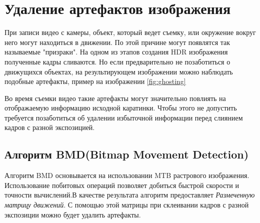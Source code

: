 \section {Удаление артефактов изображения}

При записи видео с камеры, объект, который ведет съемку, или окружение вокруг него могут находиться в движении. По этой причине могут появлятся так называемые "призраки". На одном из этапов создания HDR изображения полученные кадры сливаются. Но если предварительно не позаботиться о движущихся объектах, на результирующем изображении можно наблюдать подобные артефакты, пример на изображении \ref{fig:ghosting}

\begin{figure}[ht!]
\end{figure}

Во время съемки видео такие артефакты могут значительно повлиять на отображаемую информацию исходной каратинки. Чтобы этого не допустить требуется позаботиться об удалении избыточной информации перед слиянием кадров с разной экспозицией.

\subsection { Алгоритм BMD(Bitmap Movement Detection)}

Алгоритм BMD\cite{bib5} основывается на использовании MTB\cite{bib4} растрового изображения. Использование побитовых операций позволяет добиться быстрой скорости и точности вычислений.В качестве результата алгоритм предоставляет \textit{ Размеченную матрицу движений}. С помощью этой матрицы при склеивании кадров с разной экспозиции можно будет удалить артефакты.

